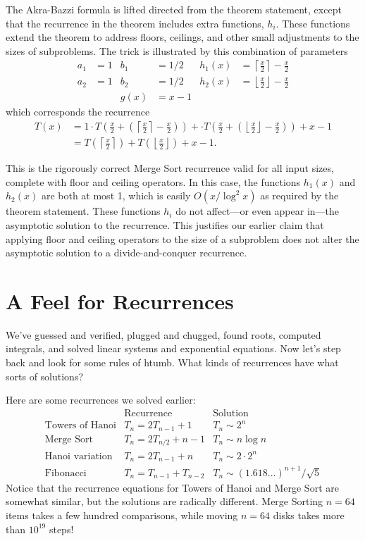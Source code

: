 The Akra-Bazzi formula is lifted directed from the theorem statement,
except that the recurrence in the theorem includes extra functions,
$h_i$.  These functions extend the theorem to address floors,
ceilings, and other small adjustments to the sizes of subproblems.
The trick is illustrated by this combination of parameters
\begin{align*}
a_1 &= 1 & b_1 & = 1/2 & h_1(x) & = \left\lceil\frac{x}{2}\right\rceil -
\frac{x}{2}\\
a_2 &= 1 & b_2 & = 1/2 & h_2(x) & = \left\lfloor\frac{x}{2}\right\rfloor -
\frac{x}{2} \\
& & g(x) & = x - 1
\end{align*}
which corresponds the recurrence
\begin{align*}
T(x) & = 1 \cdot T\left(\frac{x}{2} + \left(\left\lceil\frac{x}{2}\right\rceil -\frac{x}{2}\right)\right) + 
 \cdot T\left(\frac{x}{2} +
\left(\left\lfloor\frac{x}{2}\right\rfloor -
  \frac{x}{2}\right)\right) + x - 1 \\
 & = T\left(\left\lceil\frac{x}{2}\right\rceil\right) +
 T\left(\left\lfloor\frac{x}{2}\right\rfloor\right) + x - 1.
\end{align*}

This is the rigorously correct Merge Sort recurrence valid for all
input sizes, complete with floor and ceiling operators.  In this case,
the functions $h_1(x)$ and $h_2(x)$ are both at most 1, which is
easily $O(x
/ \log^2 x)$ as required by the theorem statement.  These functions
$h_i$ do not affect---or even appear in---the asymptotic solution to
the recurrence.  This justifies our earlier claim that applying floor
and ceiling operators to the size of a subproblem does not alter the
asymptotic solution to a divide-and-conquer recurrence.

\section{A Feel for Recurrences}

We've guessed and verified, plugged and chugged, found roots, computed
integrals, and solved linear systems and exponential equations.  Now
let's step back and look for some rules of htumb.  What kinds of
recurrences have what sorts of solutions?

Here are some recurrences we solved earlier:
\[
\begin{array}{cll}
& \text{Recurrence} & \text{Solution} \\
\text{Towers of Hanoi} & T_n = 2 T_{n-1} + 1 & T_n \sim 2^n \\
\text{Merge Sort} & T_n = 2 T_{n/2} + n - 1 & T_n \sim n \log n \\
\text{Hanoi variation} & T_n = 2 T_{n-1} + n & T_n \sim 2 \cdot 2^n \\
\text{Fibonacci} & T_n = T_{n-1} + T_{n-2} & T_n \sim
(1.618\ldots)^{n+1} / \sqrt{5}
\end{array}
\]
Notice that the recurrence equations for Towers of Hanoi and Merge
Sort are somewhat similar, but the solutions are radically different.
Merge Sorting $n = 64$ items takes a few hundred comparisons, while
moving $n = 64$ disks takes more than $10^{19}$ steps!

